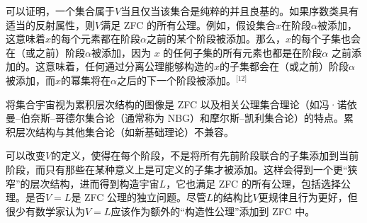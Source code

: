 可以证明，一个集合属于\( V \)当且仅当该集合是纯粹的并且良基的。如果序数类具有适当的反射属性，则\( V \)满足 ZFC 的所有公理。例如，假设集合\( x \)在阶段\( \alpha \)被添加，这意味着\( x \)的每个元素都在阶段\( \alpha \)之前的某个阶段被添加。那么，\( x \)的每个子集也会在（或之前）阶段\( \alpha \)被添加，因为 \( x \) 的任何子集的所有元素也都是在阶段\( \alpha \) 之前添加的。这意味着，任何通过分离公理能够构造的\( x \)的子集都会在（或之前）阶段\( \alpha \)被添加，而\( x \)的幂集将在\( \alpha \)之后的下一个阶段被添加。\(^\text{[12]}\)

将集合宇宙视为累积层次结构的图像是 ZFC 以及相关公理集合理论（如冯·诺依曼–伯奈斯–哥德尔集合论（通常称为 NBG）和摩尔斯–凯利集合论）的特点。累积层次结构与其他集合论（如新基础理论）不兼容。

可以改变\( V \)的定义，使得在每个阶段，不是将所有先前阶段联合的子集添加到当前阶段，而只有那些在某种意义上是可定义的子集才被添加。这样会得到一个更“狭窄”的层次结构，进而得到构造宇宙\( L \)，它也满足 ZFC 的所有公理，包括选择公理。是否\( V = L \)是 ZFC 公理的独立问题。尽管\( L \)的结构比\( V \)更规律且行为更好，但很少有数学家认为\( V = L \)应该作为额外的“构造性公理”添加到 ZFC 中。